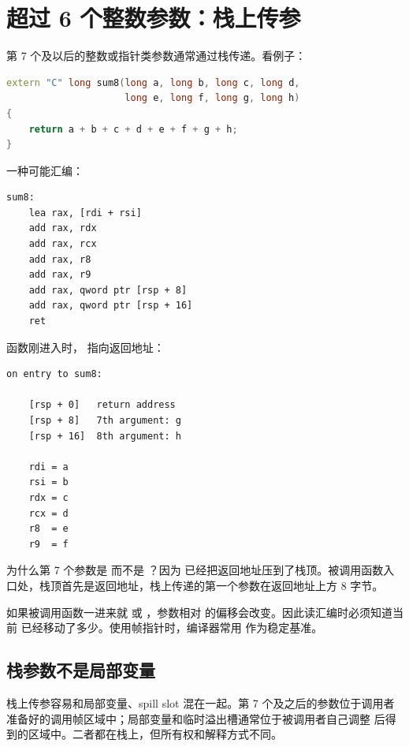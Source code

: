 \section{超过 6 个整数参数：栈上传参}

第 7 个及以后的整数或指针类参数通常通过栈传递。看例子：

\begin{lstlisting}[language=C++]
extern "C" long sum8(long a, long b, long c, long d,
                     long e, long f, long g, long h)
{
    return a + b + c + d + e + f + g + h;
}
\end{lstlisting}

一种可能汇编：

\begin{lstlisting}
sum8:
    lea rax, [rdi + rsi]
    add rax, rdx
    add rax, rcx
    add rax, r8
    add rax, r9
    add rax, qword ptr [rsp + 8]
    add rax, qword ptr [rsp + 16]
    ret
\end{lstlisting}

函数刚进入时， 指向返回地址：

\begin{lstlisting}
on entry to sum8:

    [rsp + 0]   return address
    [rsp + 8]   7th argument: g
    [rsp + 16]  8th argument: h

    rdi = a
    rsi = b
    rdx = c
    rcx = d
    r8  = e
    r9  = f
\end{lstlisting}

为什么第 7 个参数是 \code{[rsp + 8]} 而不是 \code{[rsp]}？因为  已经把返回地址压到了栈顶。被调用函数入口处，栈顶首先是返回地址，栈上传递的第一个参数在返回地址上方 8 字节。

\begin{deepdive}
如果被调用函数一进来就  或 ，参数相对  的偏移会改变。因此读汇编时必须知道当前  已经移动了多少。使用帧指针时，编译器常用  作为稳定基准。
\end{deepdive}

\subsection{栈参数不是局部变量}

栈上传参容易和局部变量、spill slot 混在一起。第 7 个及之后的参数位于调用者准备好的调用帧区域中；局部变量和临时溢出槽通常位于被调用者自己调整  后得到的区域中。二者都在栈上，但所有权和解释方式不同。

